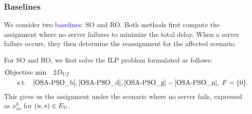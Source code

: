 \documentclass[10pt, letterpaper]{IEEEtran}
\newcommand\blue[1]{\textcolor{blue}{#1}}
\begin{document}
\begin{CJK}{UTF8}{ipxm}
\subsubsection{Baselines}
We consider two \blue{baselines}: SO and RO.
Both methods first compute the assignment where no server failures to minimize the total delay.
When a server failure occurs, they then determine the reassignment for the affected scenario.

For SO and RO, we first solve the ILP problem formulated as follows:
\begin{subequations} \label{OSA-SO-f0}
  \begin{align}
  \text{Objective}&\text{ min}\quad 2D_{\mathrm{U}f} \label{OSA-SO-f0_a} \\
  \rm{s.t.} \quad
  & \eqref{OSA-PSO_b}, \eqref{OSA-PSO_d}, \eqref{OSA-PSO_g}-\eqref{OSA-PSO_n}, \; F = \{0\}. \label{OSA-SO-f0_b}
  \end{align}
\end{subequations}
This gives us the assignment under the scenario where no server fails, expressed as $x^0_{us}$ for $(u,s) \in E_{\rm{U}}$.


\end{CJK}
\end{document}
